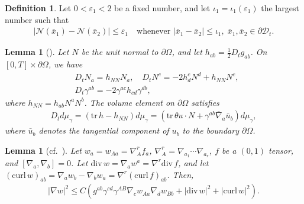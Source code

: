 \documentclass[12pt,reqno]{amsart}
\numberwithin{equation}{section}
\newtheorem{lemma}[theorem]{Lemma}
\theoremstyle{definition}
\newtheorem{definition}[theorem]{Definition}
\theoremstyle{remark}
\begin{document}
\begin{definition}\label{defn.3.5}
  Let $0<{\varepsilon}_1<2$ be a fixed number, and let $\iota_1=\iota_1({\varepsilon}_1)$ the largest number such that
  \begin{align}
    {\left\vert{{\mathcal{N}}(\bar{x}_1)-{\mathcal{N}}(\bar{x}_2)}\right\vert}{\leqslant} {\varepsilon}_1 \quad \text{whenever } {\left\vert{\bar{x}_1-\bar{x}_2}\right\vert}{\leqslant} \iota_1, \; \bar{x}_1,\bar{x}_2\in{\partial}{{\mathscr{D}_t}}.
  \end{align}
\end{definition}

\begin{lemma}[\mbox{\cite[Lemma 3.9]{CL00}}] \label{lem.CL00lem3.9}
  Let $N$ be the unit normal to ${\partial}\Omega$, and let $h_{ab}=\frac{1}{2}D_tg_{ab}$. On $[0,T]\times {\partial}\Omega$, we have
  \begin{align}\label{eq.CL00lem3.9.1}
    &D_tN_a=h_{NN}N_a,\quad D_tN^c=-2h_d^cN^d+h_{NN}N^c,\\
    &D_t\gamma^{ab}=-2\gamma^{ac}h_{cd}\gamma^{db},\label{eq.CL00lem3.9.2}
  \end{align}
  where $h_{NN}=h_{ab}N^aN^b$. The volume element on ${\partial}\Omega$ satisfies
  \begin{align}\label{eq.CL00lem3.9.3}
    D_td\mu_\gamma=({\mathrm{tr}\,} h-h_{NN})d\mu_\gamma=({\mathrm{tr}\,} \theta u\cdot N+\gamma^{ab}{\overline{\nabla}}_a\bar{u}_b)d\mu_\gamma,
  \end{align}
  where $\bar{u}_b$ denotes the tangential component of $u_b$ to the boundary ${\partial}\Omega$.
\end{lemma}

\begin{lemma}[\mbox{cf. \cite[Lemma 5.5]{CL00}}] \label{lem.CL00lem5.5}
  Let $w_a=w_{Aa}={\nabla}_A^r f_a$, ${\nabla}_A^r={\nabla}_{a_1}\cdots {\nabla}_{a_r}$, $f$ be a $(0,1)$ tensor, and $[{\nabla}_a,{\nabla}_b]=0$. Let ${\mathrm{div}\,} w={\nabla}_a w^a={\nabla}^r{\mathrm{div}\,} f$, and let $({\mathrm{curl}\,} w)_{ab}={\nabla}_aw_b-{\nabla}_b w_a={\nabla}^r({\mathrm{curl}\,} f)_{ab}$. Then,
  \begin{align}
    |{\nabla} w|^2{\leqslant} C(g^{ab}\gamma^{cd}\gamma^{AB}{\nabla}_c w_{Aa}{\nabla}_d w_{Bb}+|{\mathrm{div}\,} w|^2+|{\mathrm{curl}\,} w|^2).
  \end{align}
\end{lemma}
\end{document}
